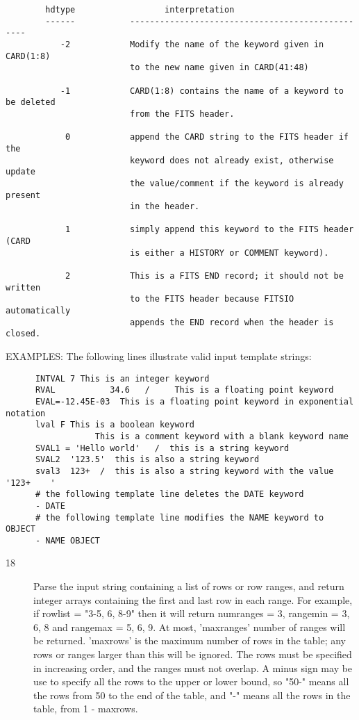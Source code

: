 \documentclass[11pt]{book}
\begin{document}
\begin{verbatim}
        hdtype                  interpretation
        ------           -------------------------------------------------
           -2            Modify the name of the keyword given in CARD(1:8)
                         to the new name given in CARD(41:48)

           -1            CARD(1:8) contains the name of a keyword to be deleted
                         from the FITS header.

            0            append the CARD string to the FITS header if the
                         keyword does not already exist, otherwise update
                         the value/comment if the keyword is already present
                         in the header.

            1            simply append this keyword to the FITS header (CARD
                         is either a HISTORY or COMMENT keyword).

            2            This is a FITS END record; it should not be written
                         to the FITS header because FITSIO automatically
                         appends the END record when the header is closed.
\end{verbatim}
     EXAMPLES:  The following lines illustrate valid input template strings:

\begin{verbatim}
      INTVAL 7 This is an integer keyword
      RVAL           34.6   /     This is a floating point keyword
      EVAL=-12.45E-03  This is a floating point keyword in exponential notation
      lval F This is a boolean keyword
                  This is a comment keyword with a blank keyword name
      SVAL1 = 'Hello world'   /  this is a string keyword
      SVAL2  '123.5'  this is also a string keyword
      sval3  123+  /  this is also a string keyword with the value '123+    '
      # the following template line deletes the DATE keyword
      - DATE
      # the following template line modifies the NAME keyword to OBJECT
      - NAME OBJECT
\end{verbatim}

\begin{description}
\item[18]  Parse the input string containing a list of rows or row ranges, and
     return integer arrays containing the first and last row in each
     range.  For example, if rowlist = "3-5, 6, 8-9" then it will
     return numranges = 3, rangemin = 3, 6, 8 and rangemax = 5, 6, 9.
     At most, 'maxranges' number of ranges will be returned.  'maxrows'
     is the maximum number of rows in the table; any rows or ranges
     larger than this will be ignored.  The rows must be specified in
     increasing order, and the ranges must not overlap. A minus sign
     may be use to specify all the rows to the upper or lower bound, so
     "50-" means all the rows from 50 to the end of the table, and "-"
    means all the rows in the table, from 1 - maxrows.
\end{description}
\end{document}
